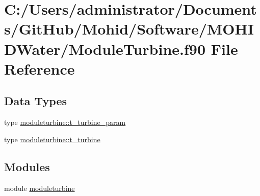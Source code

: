 \hypertarget{_module_turbine_8f90}{}\section{C\+:/\+Users/administrator/\+Documents/\+Git\+Hub/\+Mohid/\+Software/\+M\+O\+H\+I\+D\+Water/\+Module\+Turbine.f90 File Reference}
\label{_module_turbine_8f90}
\subsection*{Data Types}
\begin{DoxyCompactItemize}
\item 
type \mbox{\hyperlink{structmoduleturbine_1_1t__turbine__param}{moduleturbine\+::t\+\_\+turbine\+\_\+param}}
\item 
type \mbox{\hyperlink{structmoduleturbine_1_1t__turbine}{moduleturbine\+::t\+\_\+turbine}}
\end{DoxyCompactItemize}
\subsection*{Modules}
\begin{DoxyCompactItemize}
\item 
module \mbox{\hyperlink{namespacemoduleturbine}{moduleturbine}}
\end{DoxyCompactItemize}
